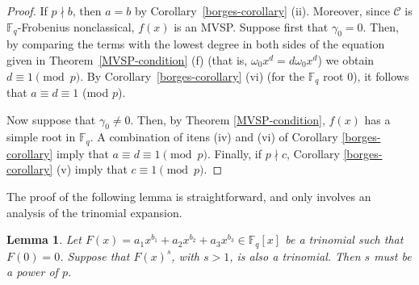 \documentclass[preprint,12pt]{elsarticle}
\newtheorem{lemma}[theorem]{Lemma}
\begin{document}
\begin{proof}
If $p \nmid b$, then $a = b$ by Corollary~\ref{borges-corollary} (ii). Moreover, since $\mathcal{C}$ is $\mathbb{F}_q$-Frobenius nonclassical, $f(x)$ is an MVSP. Suppose first that $\gamma_0 = 0$. Then, by comparing the terms with the lowest degree in both sides of the equation given in Theorem~\ref{MVSP-condition} (f) (that is, $\omega_0 x^d = d\omega_0 x^d$) we obtain $d \equiv 1 \pmod{p}$. By Corollary~\ref{borges-corollary} (vi) (for the $\mathbb{F}_q$ root $0$), it follows that $a \equiv d \equiv 1$ (mod $p$).

Now suppose that $\gamma_0 \neq 0$. Then, by Theorem \ref{MVSP-condition}, $f(x)$ has a simple root in $\mathbb{F}_q$. A combination of itens (iv) and (vi) of Corollary \ref{borges-corollary} imply that $a \equiv d \equiv 1 \pmod{p}$. Finally, if $p \nmid c$, Corollary \ref{borges-corollary} (v) imply that $c \equiv 1 \pmod{p}$.
\end{proof}

The proof of the following lemma is straightforward, and only involves an analysis of the trinomial expansion.

\begin{lemma}\label{lemm2}
Let $F(x) = a_1 x^{b_1} + a_2 x^{b_2} + a_3 x^{b_3} \in \mathbb{F}_q[x]$ be a trinomial such that $F(0) = 0$. Suppose that $F(x)^s$, with $s > 1$, is also a trinomial. Then $s$ must be a power of $p$.
\end{lemma}

\end{document}
